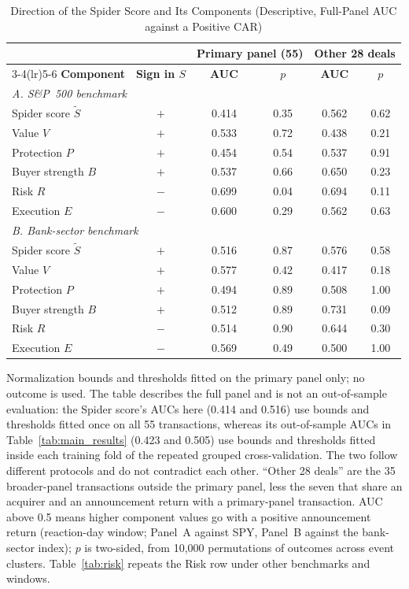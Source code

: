 \begin{table}[!t]
\caption{Direction of the Spider Score and Its Components (Descriptive, Full-Panel AUC against a Positive CAR)}
\label{tab:components}
\centering
\footnotesize
\setlength{\tabcolsep}{3pt}
\begin{tabular}{lccccc}
\toprule
 & & \multicolumn{2}{c}{\textbf{Primary panel (55)}} & \multicolumn{2}{c}{\textbf{Other 28 deals}} \\
\cmidrule(lr){3-4}\cmidrule(lr){5-6}
\textbf{Component} & \textbf{Sign in $S$} & \textbf{AUC} & \textbf{$p$} & \textbf{AUC} & \textbf{$p$} \\
\midrule
\multicolumn{6}{l}{\textit{A. S\&P~500 benchmark}} \\
Spider score $\tilde S$ & $+$ & 0.414 & 0.35 & 0.562 & 0.62 \\
Value $V$ & $+$ & 0.533 & 0.72 & 0.438 & 0.21 \\
Protection $P$ & $+$ & 0.454 & 0.54 & 0.537 & 0.91 \\
Buyer strength $B$ & $+$ & 0.537 & 0.66 & 0.650 & 0.23 \\
Risk $R$ & $-$ & 0.699 & 0.04 & 0.694 & 0.11 \\
Execution $E$ & $-$ & 0.600 & 0.29 & 0.562 & 0.63 \\
\midrule
\multicolumn{6}{l}{\textit{B. Bank-sector benchmark}} \\
Spider score $\tilde S$ & $+$ & 0.516 & 0.87 & 0.576 & 0.58 \\
Value $V$ & $+$ & 0.577 & 0.42 & 0.417 & 0.18 \\
Protection $P$ & $+$ & 0.494 & 0.89 & 0.508 & 1.00 \\
Buyer strength $B$ & $+$ & 0.512 & 0.89 & 0.731 & 0.09 \\
Risk $R$ & $-$ & 0.514 & 0.90 & 0.644 & 0.30 \\
Execution $E$ & $-$ & 0.569 & 0.49 & 0.500 & 1.00 \\
\bottomrule
\end{tabular}
\par\vspace{2pt}\parbox{0.94\columnwidth}{\scriptsize Normalization bounds and thresholds fitted on the primary panel only; no outcome
is used. The table describes the full panel and is not an out-of-sample evaluation: the Spider score's AUCs here (0.414
and 0.516) use bounds and thresholds fitted once on all 55 transactions, whereas its out-of-sample AUCs in
Table~\ref{tab:main_results} (0.423 and 0.505) use bounds and thresholds fitted inside each training fold of the
repeated grouped cross-validation. The two follow different protocols and do not contradict each other. ``Other 28 deals'' are the 35 broader-panel transactions outside the primary panel, less the seven that share an
acquirer and an announcement return with a primary-panel transaction. AUC above 0.5 means
higher component values go with a positive announcement return (reaction-day window; Panel~A against SPY, Panel~B against the
bank-sector index); $p$ is two-sided, from 10,000 permutations of outcomes across event clusters. Table~\ref{tab:risk} repeats the
Risk row under other benchmarks and windows.}
\end{table}

